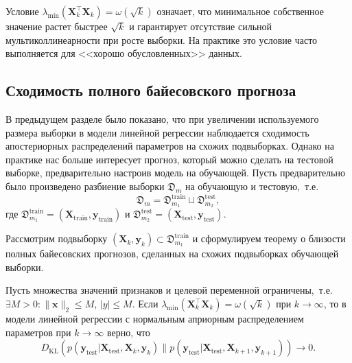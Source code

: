 Условие $\lambda_{\min}(\mathbf{X}_k^\top \mathbf{X}_k) = \omega(\sqrt{k})$ означает, что минимальное собственное значение растет быстрее $\sqrt{k}$ и гарантирует отсутствие сильной мультиколлинеарности при росте выборки. На практике это условие часто выполняется для <<хорошо обусловленных>> данных.

\subsection{Сходимость полного байесовского прогноза}

В предыдущем разделе было показано, что при увеличении используемого размера выборки в модели линейной регрессии наблюдается сходимость апостериорных распределений параметров на схожих подвыборках. Однако на практике нас больше интересует прогноз, который можно сделать на тестовой выборке, предварительно настроив модель на обучающей. Пусть предварительно было произведено разбиение выборки $\mathfrak{D}_m$ на обучающую и тестовую,~т.\:е.
\begin{equation}
    \mathfrak{D}_m = \mathfrak{D}_{m_1}^{\text{train}} \sqcup \mathfrak{D}_{m_2}^{\text{test}},
\end{equation}
где $\mathfrak{D}_{m_1}^{\text{train}} = (\mathbf{X}_{\text{train}}, \mathbf{y}_{\text{train}})$ и $\mathfrak{D}_{m_2}^{\text{test}} = (\mathbf{X}_{\text{test}}, \mathbf{y}_{\text{test}})$.

Рассмотрим подвыборку $(\mathbf{X}_k, \mathbf{y}_k) \subset \mathfrak{D}_{m_1}^{\text{train}}$ и сформулируем теорему о близости полных байесовских прогнозов, сделанных на схожих подвыборках обучающей выборки.

\begin{theorem}\label{th:prediction-convergence}
    Пусть множества значений признаков и целевой переменной ограничены,~т.\:е. $\exists M > 0: \|\mathbf{x}\|_2 \leqslant M$, $|y| \leqslant M$. Если $\lambda_{\min}(\mathbf{X}_k^\top \mathbf{X}_k) = \omega(\sqrt{k})$ при $k \to \infty$, то в модели линейной регрессии с нормальным априорным распределением параметров при $k \to \infty$ верно, что
    \begin{equation}
        \label{eq:prediction-convergence}
        D_{\mathrm{KL}}\left(p(\mathbf{y}_{\mathrm{test}}|\mathbf{X}_{\mathrm{test}}, \mathbf{X}_k, \mathbf{y}_k) \| p(\mathbf{y}_{\mathrm{test}}|\mathbf{X}_{\mathrm{test}}, \mathbf{X}_{k+1}, \mathbf{y}_{k+1})\right) \to 0.
    \end{equation}
\end{theorem}


